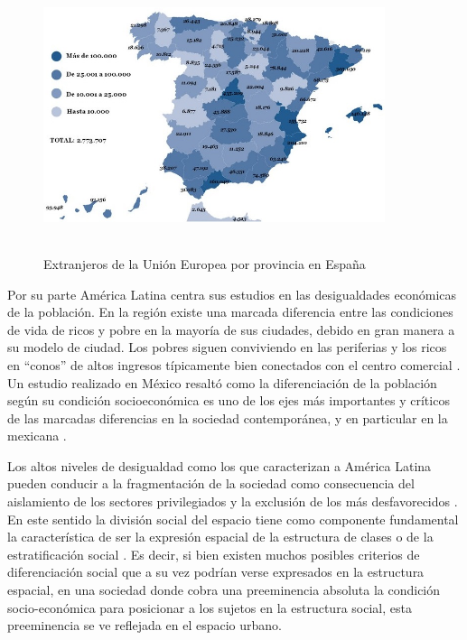 \begin{figure}[htb]
	\centering
	\includegraphics[width=10cm, height=8cm]{Images/Emigrantes.jpg} 
	\caption{Extranjeros de la Unión Europea por provincia en España }
\end{figure}

Por su parte América Latina centra sus estudios en las desigualdades económicas de la población. En la región existe una marcada diferencia entre las condiciones de vida de ricos y pobre en la mayoría de sus ciudades, debido en gran manera a su modelo de ciudad. Los pobres siguen conviviendo en las periferias y los ricos en “conos” de altos ingresos típicamente bien conectados con el centro comercial \cite{Janoschka2002ElNM}. Un estudio realizado en México resaltó como la diferenciación de la población según su condición socioeconómica es uno de los ejes más importantes y críticos de las marcadas diferencias en la sociedad contemporánea, y en particular en la mexicana \cite{Duhau2003DivisinSD}.

Los altos niveles de desigualdad como los que caracterizan a América Latina pueden conducir a la fragmentación de la sociedad como consecuencia del aislamiento de los sectores privilegiados y la exclusión de los más desfavorecidos \cite{Barry1998SocialES}. En este sentido la división social del espacio tiene como componente fundamental la característica de ser la expresión espacial de la estructura de clases o de la estratificación social \cite{Sarav2008MundosAS}. Es decir, si bien existen muchos posibles criterios de diferenciación social que a su vez podrían verse expresados en la estructura espacial, en una sociedad donde cobra una preeminencia absoluta la condición socio-económica para posicionar a los sujetos en la estructura social, esta preeminencia se ve reflejada en el espacio urbano.

